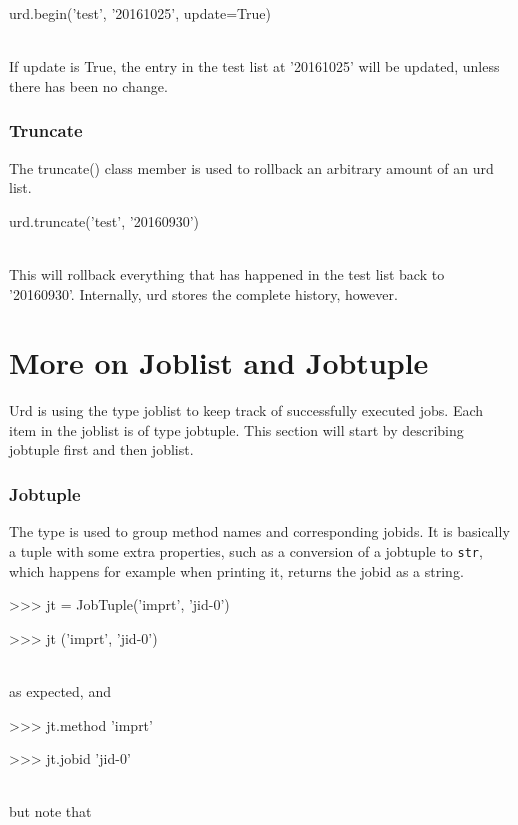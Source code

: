 \begin{python}
  urd.begin('test', '20161025', update=True)
\end{python}
\\
If update is True, the entry in the test list at '20161025' will be
updated, unless there has been no change.

\subsubsection{Truncate}

The truncate() class member is used to rollback an arbitrary amount of
an urd list.

\begin{python}
  urd.truncate('test', '20160930')
\end{python}
\\
This will rollback everything that has happened in the test list back
to '20160930'.  Internally, urd stores the complete history, however.



\newpage
\section{More on Joblist and Jobtuple}

Urd is using the type joblist to keep track of successfully executed
jobs.  Each item in the joblist is of type jobtuple.  This section
will start by describing jobtuple first and then joblist.

\subsubsection{Jobtuple}

The \jobtuple type is used to group method names and corresponding
jobids.  It is basically a tuple with some extra properties, such as a
conversion of a jobtuple to \texttt{str}, which happens for example
when printing it, returns the jobid as a string.

\begin{pythonBEG}
>>> jt = JobTuple('imprt', 'jid-0')

>>> jt
('imprt', 'jid-0')
\end{pythonBEG}
\\
as expected, and

\begin{pythonMID}
>>> jt.method
'imprt'

>>> jt.jobid
'jid-0'
\end{pythonMID}
\\
but note that

